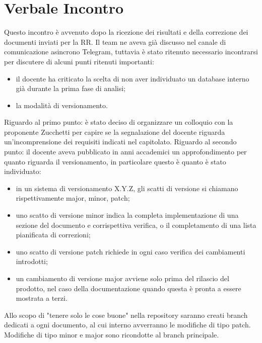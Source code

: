 \section{Verbale Incontro}
    Questo incontro è avvenuto dopo la ricezione dei risultati e della correzione dei documenti inviati per la RR. Il team ne aveva già discusso nel canale di comunicazione asincrono Telegram, tuttavia è stato ritenuto necessario incontrarsi per discutere di alcuni punti ritenuti importanti:
    \begin{itemize}
        \item il docente ha criticato la scelta di non aver individuato un database interno già durante la prima fase di analisi;
        \item la modalità di versionamento.
    \end{itemize}
    Riguardo al primo punto: è stato deciso di organizzare un colloquio con la proponente Zucchetti per capire se la segnalazione del docente riguarda un'incomprensione dei requisiti indicati nel capitolato.
    \noindent Riguardo al secondo punto: il docente aveva pubblicato in anni accademici un approfondimento per quanto riguarda il versionamento, in particolare questo è quanto è stato individuato:
    \begin{itemize}
        \item in un sistema di versionamento X.Y.Z, gli scatti di versione si chiamano rispettivamente major, minor, patch;
        \item uno scatto di versione minor indica la completa implementazione di una sezione del documento e corrispettiva verifica, o il completamento di una lista pianificata di correzioni;
        \item uno scatto di versione patch richiede in ogni caso verifica dei cambiamenti introdotti;
        \item un cambiamento di versione major avviene solo prima del rilascio del prodotto, nel caso della documentazione quando questa è pronta a essere mostrata a terzi.
    \end{itemize}
    Allo scopo di "tenere solo le cose buone" nella repository saranno creati branch dedicati a ogni documento, al cui interno avverranno le modifiche di tipo patch. Modifiche di tipo minor e major sono ricondotte al branch principale.